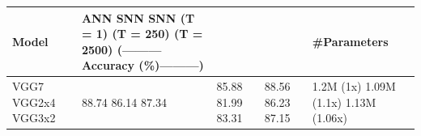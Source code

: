 \begin{tabular}{lllll}
\toprule
Model & ANN SNN SNN (T = 1) (T = 250) (T = 2500) (———Accuracy (\%)———) &  &  & \#Parameters \\
\midrule
VGG7 VGG2x4 VGG3x2 & 88.74 86.14 87.34 & 85.88 81.99 83.31 & 88.56 86.23 87.15 & 1.2M (1x) 1.09M (1.1x) 1.13M (1.06x) \\
\bottomrule
\end{tabular}

